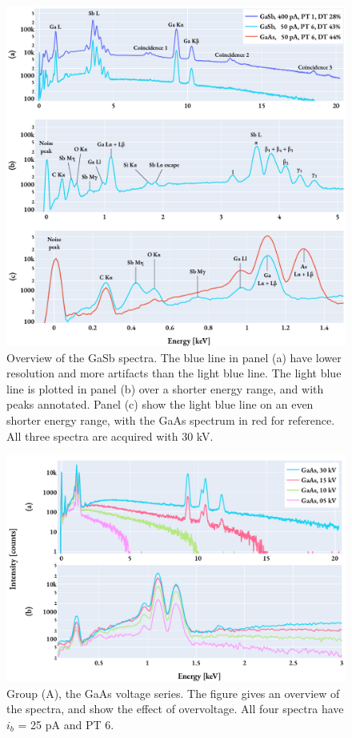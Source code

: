 \begin{figure}[hbtp]
    \centering
    \includegraphics[width=0.99\linewidth]{figures/results/spectrum_overviews.pdf}
    \caption{
        Overview of the GaSb spectra.
        The blue line in panel (a) have lower resolution and more artifacts than the light blue line.
        The light blue line is plotted in panel (b) over a shorter energy range, and with peaks annotated.
        Panel (c) show the light blue line on an even shorter energy range, with the GaAs spectrum in red for reference.
        All three spectra are acquired with 30 kV.
    }
    \label{fig:results:overviewGaSb_withArtifacts}
\end{figure}


\begin{figure}[hbtp]
    \centering
    \includegraphics[width=0.85\linewidth]{figures/results/GaAs_voltages.pdf}
    \caption{
        Group (A), the GaAs voltage series.
        The figure gives an overview of the spectra, and show the effect of overvoltage.
        All four spectra have $i_b$ = 25 pA and PT 6.
    }
    \label{fig:results:GaAs_voltages}
\end{figure}


